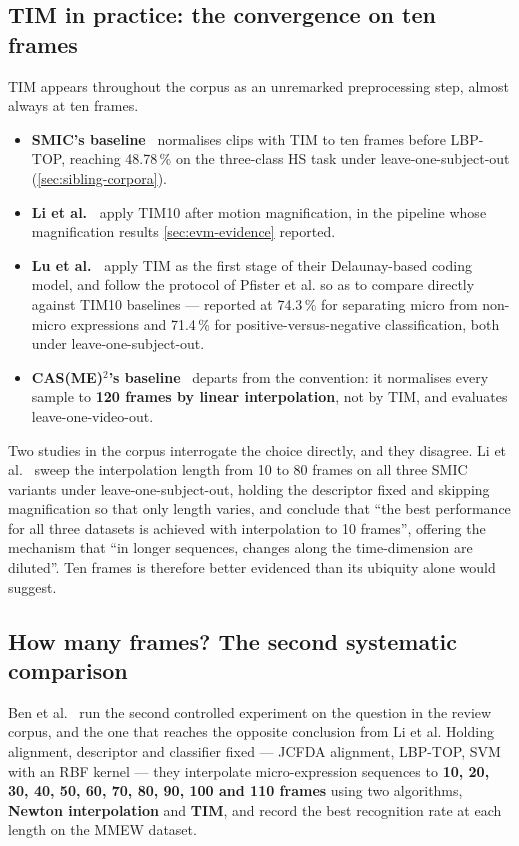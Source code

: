 \subsection{TIM in practice: the convergence on ten frames}
\label{sec:tim-ten-frames}

TIM appears throughout the corpus as an unremarked preprocessing step, almost always at ten frames.

\begin{itemize}
	\item \textbf{SMIC's baseline}~\cite{liX2013} normalises clips with TIM to ten frames before LBP-TOP, reaching 48.78\,\% on the three-class HS task under leave-one-subject-out (\autoref{sec:sibling-corpora}).
	\item \textbf{Li et al.~\cite{liX2018}} apply TIM10 after motion magnification, in the pipeline whose magnification results \autoref{sec:evm-evidence} reported.
	\item \textbf{Lu et al.~\cite{lu2015}} apply TIM as the first stage of their Delaunay-based coding model, and follow the protocol of Pfister et al. so as to compare directly against TIM10 baselines --- reported at 74.3\,\% for separating micro from non-micro expressions and 71.4\,\% for positive-versus-negative classification, both under leave-one-subject-out.
	\item \textbf{CAS(ME)$^2$'s baseline}~\cite{qu2016} departs from the convention: it normalises every sample to \textbf{120 frames by linear interpolation}, not by TIM, and evaluates leave-one-video-out.
\end{itemize}

Two studies in the corpus interrogate the choice directly, and they disagree. Li et al.~\cite{liX2018} sweep the interpolation length from 10 to 80 frames on all three SMIC variants under leave-one-subject-out, holding the descriptor fixed and skipping magnification so that only length varies, and conclude that ``the best performance for all three datasets is achieved with interpolation to 10 frames'', offering the mechanism that ``in longer sequences, changes along the time-dimension are diluted''. Ten frames is therefore better evidenced than its ubiquity alone would suggest.

\subsection{How many frames? The second systematic comparison}
\label{sec:tim-how-many}

Ben et al.~\cite{ben2021} run the second controlled experiment on the question in the review corpus, and the one that reaches the opposite conclusion from Li et al. Holding alignment, descriptor and classifier fixed --- JCFDA alignment, LBP-TOP, SVM with an RBF kernel --- they interpolate micro-expression sequences to \textbf{10, 20, 30, 40, 50, 60, 70, 80, 90, 100 and 110 frames} using two algorithms, \textbf{Newton interpolation} and \textbf{TIM}, and record the best recognition rate at each length on the MMEW dataset.

